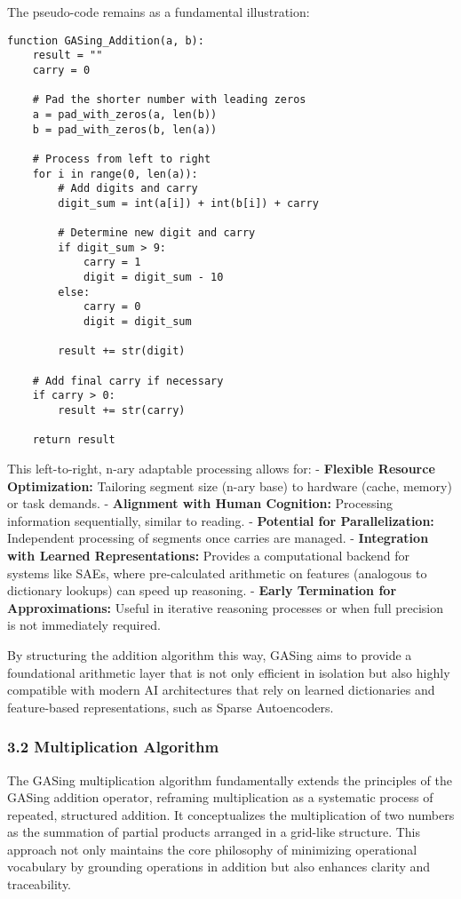 The pseudo-code remains as a fundamental illustration:

\begin{verbatim}
function GASing_Addition(a, b):
    result = ""
    carry = 0
    
    # Pad the shorter number with leading zeros
    a = pad_with_zeros(a, len(b))
    b = pad_with_zeros(b, len(a))
    
    # Process from left to right
    for i in range(0, len(a)):
        # Add digits and carry
        digit_sum = int(a[i]) + int(b[i]) + carry
        
        # Determine new digit and carry
        if digit_sum > 9:
            carry = 1
            digit = digit_sum - 10
        else:
            carry = 0
            digit = digit_sum
            
        result += str(digit)
    
    # Add final carry if necessary
    if carry > 0:
        result += str(carry)
        
    return result

\end{verbatim}

This left-to-right, n-ary adaptable processing allows for:
-   \textbf{Flexible Resource Optimization:} Tailoring segment size (n-ary base) to hardware (cache, memory) or task demands.
-   \textbf{Alignment with Human Cognition:} Processing information sequentially, similar to reading.
-   \textbf{Potential for Parallelization:} Independent processing of segments once carries are managed.
-   \textbf{Integration with Learned Representations:} Provides a computational backend for systems like SAEs, where pre-calculated arithmetic on features (analogous to dictionary lookups) can speed up reasoning.
-   \textbf{Early Termination for Approximations:} Useful in iterative reasoning processes or when full precision is not immediately required.

By structuring the addition algorithm this way, GASing aims to provide a foundational arithmetic layer that is not only efficient in isolation but also highly compatible with modern AI architectures that rely on learned dictionaries and feature-based representations, such as Sparse Autoencoders.
\subsubsection{3.2 Multiplication Algorithm}

The GASing multiplication algorithm fundamentally extends the principles of the GASing addition operator, reframing multiplication as a systematic process of repeated, structured addition. It conceptualizes the multiplication of two numbers as the summation of partial products arranged in a grid-like structure. This approach not only maintains the core philosophy of minimizing operational vocabulary by grounding operations in addition but also enhances clarity and traceability.

